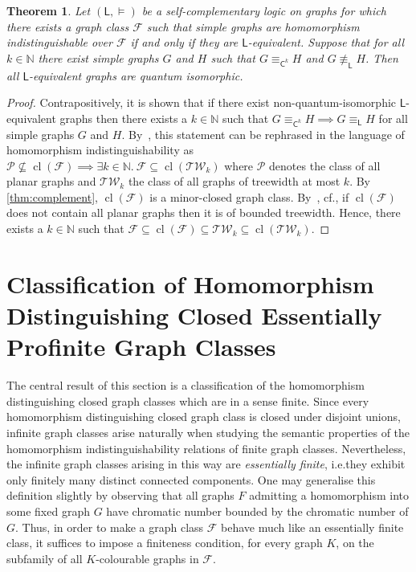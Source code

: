 \documentclass[3p,final]{elsarticle}
\DeclareMathOperator{\cl}{cl}
\newtheorem{theorem}{Theorem}
\begin{document}
	\begin{theorem} \label{cor:quantum}
		Let $(\mathsf{L}, \models)$ be a self-complementary logic on graphs for which there exists a graph class
		$\mathcal{F}$ such that simple graphs are homomorphism indistinguishable over $\mathcal{F}$ if and only if they are $\mathsf{L}$-equivalent.
		Suppose that for all $k \in \mathbb{N}$ there exist simple graphs $G$ and $H$ such that $G \equiv_{\mathsf{C}^k} H$ and $G \not\equiv_{\mathsf{L}} H$.
		Then all $\mathsf{L}$-equivalent graphs are quantum isomorphic.
	\end{theorem}
	\begin{proof}
		Contrapositively, it is shown that if there exist non-quantum-isomorphic $\mathsf{L}$-equivalent graphs then there exists a $k \in \mathbb{N}$
		such that $G \equiv_{\mathsf{C}^k} H \implies G \equiv_{\mathsf{L}} H$ for all simple graphs $G$ and $H$.
		By~\cite{mancinska_quantum_2019,dvorak_recognizing_2010}, this statement can be rephrased in the language of homomorphism indistinguishability as $\mathcal{P} \not\subseteq \cl(\mathcal{F}) \implies \exists k \in \mathbb{N}.\ \mathcal{F} \subseteq \cl(\mathcal{TW}_k)$ where $\mathcal{P}$ denotes the class of all planar graphs and $\mathcal{TW}_k$ the class of all graphs of treewidth at most $k$.
		By \cref{thm:complement}, $\cl(\mathcal{F})$ is a minor-closed graph class. 
		By~\cite[(2.1)]{robertson_graph_1986}, cf.\@ \cite[Theorem~3.8]{nesetril_sparsity_2012}, if $\cl(\mathcal{F})$ does not contain all planar graphs then it is of bounded treewidth. Hence, there exists a $k \in \mathbb{N}$ such that $\mathcal{F} \subseteq \cl(\mathcal{F}) \subseteq \mathcal{TW}_k \subseteq \cl(\mathcal{TW}_k)$.
	\end{proof}
	
	
	\section{Classification of Homomorphism Distinguishing Closed Essentially Profinite Graph Classes}
	\label{sec:profinite}
	 
	The central result of this section is a classification of the homomorphism distinguishing closed graph classes which are in a sense finite.
	Since every homomorphism distinguishing closed graph class is closed under disjoint unions, 
	infinite graph classes arise naturally when studying the semantic properties of the homomorphism indistinguishability relations of finite graph classes. Nevertheless, the infinite graph classes arising in this way are \emph{essentially finite}, i.e.\@ they exhibit only finitely many distinct connected components.
	One may generalise this definition slightly by observing that all graphs $F$ admitting a homomorphism into some fixed graph $G$ have chromatic number bounded by the chromatic number of $G$.
	Thus, in order to make a graph class $\mathcal{F}$ behave much like an essentially finite class, it suffices to impose a finiteness condition, for every graph $K$, on the subfamily of all $K$-colourable graphs in $\mathcal{F}$.
	
\end{document}
